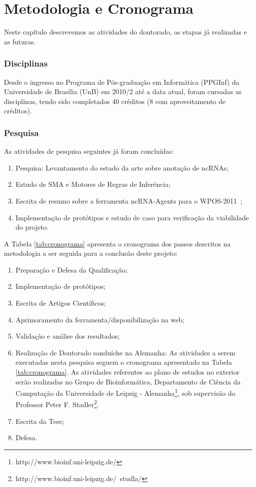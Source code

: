 \chapter{Metodologia e Cronograma}
\label{sec:MetodologiaCronograma}

Neste capítulo descrevemos as atividades do doutorado, as etapas já realizadas e as futuras.

\subsection{Disciplinas} \label{sec:AtividadesRealizadas}

Desde o ingresso no Programa de Pós-graduação em Informática (PPGInf) da
Universidade de Brasília (UnB) em 2010/2 até a data atual, foram cursadas as disciplinas, tendo sido completados 40 créditos (8 com aproveitamento de créditos). 

\subsection{Pesquisa} \label{sec:cronogramaAtividades}

As atividades de pesquisa seguintes já foram concluídas:

\begin{enumerate}
\item Pesquisa: Levantamento do estado da arte sobre anotação de ncRNAs;
\item Estudo de SMA e Motores de Regras de Inferência;
\item Escrita de resumo sobre a ferramenta ncRNA-Agents para o WPOS-2011~\citep{wosley2011:2011};
\item Implementação de protótipos e estudo de caso para verificação da viabilidade do projeto.
\end{enumerate}

A Tabela \ref{tab:cronograma} apresenta o cronograma dos passos descritos na metodologia a ser seguida para a conclusão deste projeto:  

\begin{enumerate}
\item Preparação e Defesa da Qualificação; 
\item Implementação de protótipos;
\item Escrita de Artigos Científicos;
\item Aprimoramento da ferramenta/disponibilização na web;
\item Validação e análise dos resultados;
\item Realização de Doutorado sanduíche na Alemanha: As atividades a serem executadas nesta pesquisa seguem o cronograma apresentado na Tabela \ref{tab:cronograma}.
As atividades referentes ao plano de estudos no exterior serão realizadas no
Grupo de Bioinformática, Departamento de Ciência da Computação da Universidade de Leipzig - Alemanha\footnote{http://www.bioinf.uni-leipzig.de/}, sob supervisão do Professor Peter F. Stadler\footnote{http://www.bioinf.uni-leipzig.de/~studla/}.
\item Escrita da Tese;
\item Defesa.
\end{enumerate}


